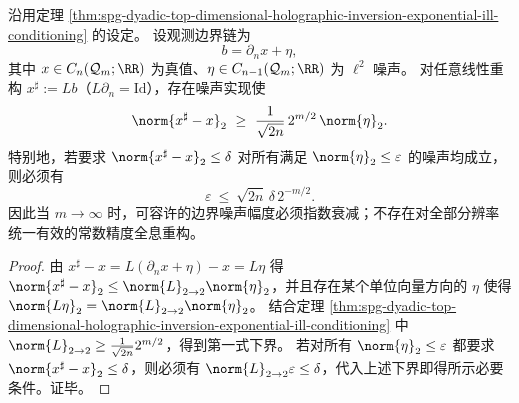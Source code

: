 \begin{corollary}\label{cor:spg-dyadic-holographic-reconstruction-noise-budget}
沿用定理 \ref{thm:spg-dyadic-top-dimensional-holographic-inversion-exponential-ill-conditioning} 的设定。
设观测边界链为
\[
b=\partial_n x+\eta,
\]
其中 \(x\in C_n(\mathcal Q_m;\RR)\) 为真值、\(\eta\in C_{n-1}(\mathcal Q_m;\RR)\) 为 \(\ell^2\) 噪声。
对任意线性重构 \(x^\sharp:=Lb\)（\(L\partial_n=\mathrm{Id}\)），存在噪声实现使
\[
\norm{x^\sharp-x}_2\ \ge\ \frac{1}{\sqrt{2n}}\,2^{m/2}\,\norm{\eta}_2.
\]
特别地，若要求 \(\norm{x^\sharp-x}_2\le \delta\) 对所有满足 \(\norm{\eta}_2\le \varepsilon\) 的噪声均成立，则必须有
\[
\varepsilon\ \le\ \sqrt{2n}\,\delta\,2^{-m/2}.
\]
因此当 \(m\to\infty\) 时，可容许的边界噪声幅度必须指数衰减；不存在对全部分辨率统一有效的常数精度全息重构。
\end{corollary}
\begin{proof}
由 \(x^\sharp-x=L(\partial_n x+\eta)-x=L\eta\) 得 \(\norm{x^\sharp-x}_2\le \norm{L}_{2\to 2}\norm{\eta}_2\)，并且存在某个单位向量方向的 \(\eta\) 使得 \(\norm{L\eta}_2=\norm{L}_{2\to 2}\norm{\eta}_2\)。
结合定理 \ref{thm:spg-dyadic-top-dimensional-holographic-inversion-exponential-ill-conditioning} 中 \(\norm{L}_{2\to 2}\ge \frac{1}{\sqrt{2n}}2^{m/2}\)，得到第一式下界。
若对所有 \(\norm{\eta}_2\le \varepsilon\) 都要求 \(\norm{x^\sharp-x}_2\le \delta\)，则必须有 \(\norm{L}_{2\to 2}\varepsilon\le \delta\)，代入上述下界即得所示必要条件。证毕。
\end{proof}

